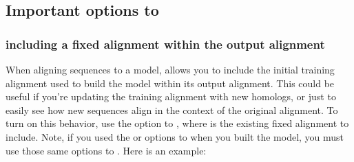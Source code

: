 \newpage
\subsection{Important options to }

\subsubsection{including a fixed alignment within the output alignment}
When aligning sequences to a model,  allows you to
include the initial training alignment used to build the model within
its output alignment. This could be useful if you're updating
the training alignment with new homologs, or just to easily see how
new sequences align in the context of the original alignment. To
turn on this behavior, use the  option to
, where  is the existing fixed alignment to
include. Note, if you used the  or 
options to  when you built the model, you must use those
same options to . Here is an example:

